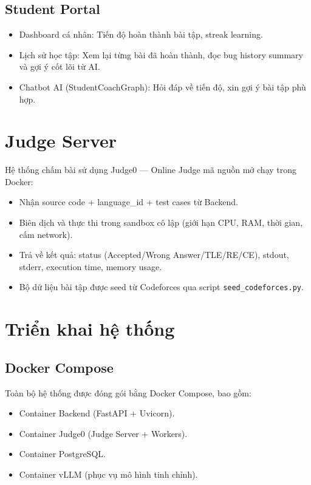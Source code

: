 \subsection{Student Portal}

\begin{itemize}
    \item Dashboard cá nhân: Tiến độ hoàn thành bài tập, streak learning.
    \item Lịch sử học tập: Xem lại từng bài đã hoàn thành, đọc bug history summary và gợi ý cốt lõi từ AI.
    \item Chatbot AI (StudentCoachGraph): Hỏi đáp về tiến độ, xin gợi ý bài tập phù hợp.
\end{itemize}

\section{Judge Server}

Hệ thống chấm bài sử dụng Judge0 --- Online Judge mã nguồn mở chạy trong Docker:

\begin{itemize}
    \item Nhận source code + language\_id + test cases từ Backend.
    \item Biên dịch và thực thi trong sandbox cô lập (giới hạn CPU, RAM, thời gian, cấm network).
    \item Trả về kết quả: status (Accepted/Wrong Answer/TLE/RE/CE), stdout, stderr, execution time, memory usage.
    \item Bộ dữ liệu bài tập được seed từ Codeforces qua script \texttt{seed\_codeforces.py}.
\end{itemize}

\section{Triển khai hệ thống}

\subsection{Docker Compose}

Toàn bộ hệ thống được đóng gói bằng Docker Compose, bao gồm:
\begin{itemize}
    \item Container Backend (FastAPI + Uvicorn).
    \item Container Judge0 (Judge Server + Workers).
    \item Container PostgreSQL.
    \item Container vLLM (phục vụ mô hình tinh chỉnh).
\end{itemize}


